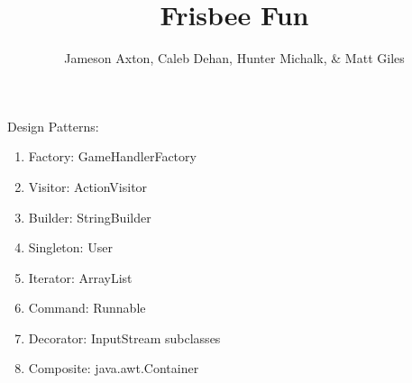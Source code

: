 \documentclass[12pt]{"article"}
\author{\Large Jameson Axton, Caleb Dehan, Hunter Michalk, \& Matt Giles}
\title{Frisbee Fun}
\begin{document}
	\maketitle
	Design Patterns: 
	\begin{enumerate}
		\item Factory: GameHandlerFactory
		\item Visitor: ActionVisitor
		\item Builder: StringBuilder
		\item Singleton: User
		\item Iterator: ArrayList
		\item Command: Runnable
		\item Decorator: InputStream subclasses
		\item Composite: java.awt.Container
	\end{enumerate}
\end{document}
